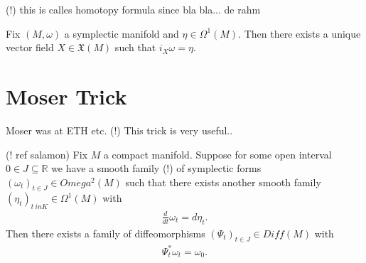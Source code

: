 \begin{remark}
(!) this is calles homotopy formula since bla bla... de rahm 
\end{remark}

\begin{proposition} \label{propisom}
Fix $(M,\omega)$ a symplectic manifold and $\eta \in \Omega^1(M)$. Then there exists a unique vector field $X \in \mathfrak{X}(M)$ such that $i_X \omega = \eta$.
\end{proposition}

\section{Moser Trick}

\begin{remark}
Moser was at ETH etc. (!)
This trick is very useful..
\end{remark}

\begin{theorem}\label{mostr}
(! ref salamon)
Fix $M$ a compact manifold. Suppose for some open interval $0 \in J \subseteq \mathbb{R}$ we have a smooth family (!) of symplectic forms $(\omega_t)_{t \in J} \in Omega^2(M)$ such that there exists another smooth family $(\eta_t)_{t \ in K} \in \Omega^1(M)$ with
\begin{align*}
\frac{d}{dt} \omega_t = d\eta_t.
\end{align*}
Then there exists a family of diffeomorphisms $(\Psi_t)_{t \in J} \in Diff(M)$ with
\begin{align*}
\Psi^*_t \omega_t = \omega_0.
\end{align*}
\end{theorem}

